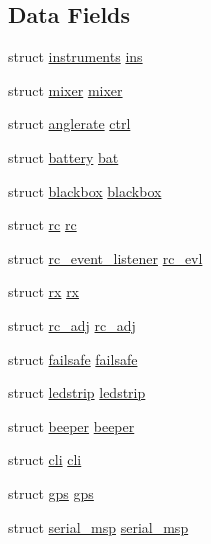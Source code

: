 \subsection*{Data Fields}
\begin{DoxyCompactItemize}
\item 
struct \hyperlink{structinstruments}{instruments} \hyperlink{structninja_ac72407a6037949c11e9690be6288d3af}{ins}
\item 
struct \hyperlink{structmixer}{mixer} \hyperlink{structninja_ab1b0a20ef8f44edfd621047034ffff04}{mixer}
\item 
struct \hyperlink{structanglerate}{anglerate} \hyperlink{structninja_a0e80ee51f27f1bfe247ab00a3641d623}{ctrl}
\item 
struct \hyperlink{structbattery}{battery} \hyperlink{structninja_ad96b8d0784e9c040a0d7aa035343267f}{bat}
\item 
struct \hyperlink{structblackbox}{blackbox} \hyperlink{structninja_ab9d67ba52c2718aee3e74ef1aa0dc949}{blackbox}
\item 
struct \hyperlink{structrc}{rc} \hyperlink{structninja_add741241fe575999e970c52a08dde381}{rc}
\item 
struct \hyperlink{structrc__event__listener}{rc\+\_\+event\+\_\+listener} \hyperlink{structninja_a6f1a781eaf3203ecee063d26b42e7fe8}{rc\+\_\+evl}
\item 
struct \hyperlink{structrx}{rx} \hyperlink{structninja_a15c6dfd2dd339f6161ff1f89a2d13fb1}{rx}
\item 
struct \hyperlink{structrc__adj}{rc\+\_\+adj} \hyperlink{structninja_a673840aecfee3f5687129d4920de8be5}{rc\+\_\+adj}
\item 
struct \hyperlink{structfailsafe}{failsafe} \hyperlink{structninja_a4b84e4178b3f03dfc4eb64979180e14e}{failsafe}
\item 
struct \hyperlink{structledstrip}{ledstrip} \hyperlink{structninja_ae95c5e9e4be5546c58c232456c48b766}{ledstrip}
\item 
struct \hyperlink{structbeeper}{beeper} \hyperlink{structninja_a9ccb6f5f224cd1f6c3678521a27d81da}{beeper}
\item 
struct \hyperlink{structcli}{cli} \hyperlink{structninja_a5968432bc72bca4807cf2900446bca59}{cli}
\item 
struct \hyperlink{structgps}{gps} \hyperlink{structninja_a80c38237ab31a6eb2c8beb9fe48a0c94}{gps}
\item 
struct \hyperlink{structserial__msp}{serial\+\_\+msp} \hyperlink{structninja_a6634274e49180cc881d0145ded10a967}{serial\+\_\+msp}

\end{DoxyCompactItemize}
